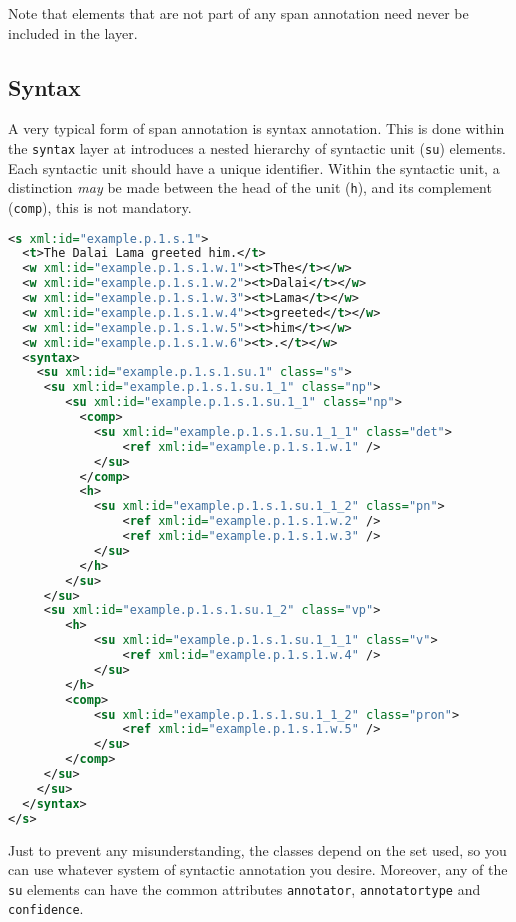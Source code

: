 \documentclass[a4paper,12pt]{report}
\begin{document}
Note that elements that are not part of any span annotation need never be included in the layer.

\subsection{Syntax}

A very typical form of span annotation is syntax annotation. This is done within the \texttt{syntax} layer at introduces a nested hierarchy of syntactic unit (\texttt{su}) elements. Each syntactic unit should have a unique identifier. Within the syntactic unit, a distinction \emph{may} be made between the head of the unit (\texttt{h}), and its complement (\texttt{comp}), this is not mandatory.

\begin{lstlisting}[language=xml]
<s xml:id="example.p.1.s.1">
  <t>The Dalai Lama greeted him.</t>
  <w xml:id="example.p.1.s.1.w.1"><t>The</t></w>
  <w xml:id="example.p.1.s.1.w.2"><t>Dalai</t></w>
  <w xml:id="example.p.1.s.1.w.3"><t>Lama</t></w>
  <w xml:id="example.p.1.s.1.w.4"><t>greeted</t></w>
  <w xml:id="example.p.1.s.1.w.5"><t>him</t></w>
  <w xml:id="example.p.1.s.1.w.6"><t>.</t></w>
  <syntax>
    <su xml:id="example.p.1.s.1.su.1" class="s">     
     <su xml:id="example.p.1.s.1.su.1_1" class="np">    
        <su xml:id="example.p.1.s.1.su.1_1" class="np">
          <comp>
            <su xml:id="example.p.1.s.1.su.1_1_1" class="det">
                <ref xml:id="example.p.1.s.1.w.1" />       
            </su>
          </comp>
          <h>
            <su xml:id="example.p.1.s.1.su.1_1_2" class="pn">
                <ref xml:id="example.p.1.s.1.w.2" />
                <ref xml:id="example.p.1.s.1.w.3" />        
            </su>
          </h>          
        </su>
     </su>
     <su xml:id="example.p.1.s.1.su.1_2" class="vp"> 
        <h>
            <su xml:id="example.p.1.s.1.su.1_1_1" class="v">
                <ref xml:id="example.p.1.s.1.w.4" />       
            </su>
        </h>
        <comp>
            <su xml:id="example.p.1.s.1.su.1_1_2" class="pron">
                <ref xml:id="example.p.1.s.1.w.5" />       
            </su>
        </comp>
     </su>    
    </su>
  </syntax>
</s>
\end{lstlisting}

Just to prevent any misunderstanding, the classes depend on the set used, so you can use whatever system of syntactic annotation you desire. Moreover, any of the \texttt{su} elements can have the common attributes \texttt{annotator}, \texttt{annotatortype} and \texttt{confidence}.
\end{document}
